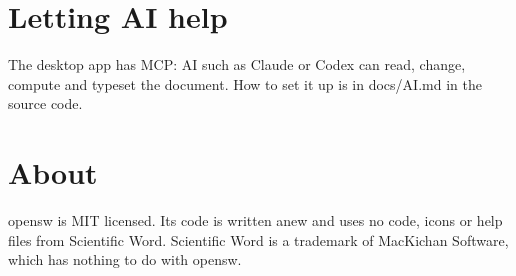 \section{Letting AI help}

The desktop app has MCP: AI such as Claude or Codex can read, change, compute and typeset the document. How to set it up is in docs/AI.md in the source code.

\section{About}

opensw is MIT licensed. Its code is written anew and uses no code, icons or help files from Scientific Word. Scientific Word is a trademark of MacKichan Software, which has nothing to do with opensw.
